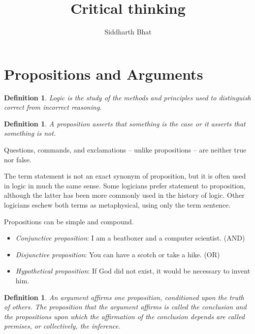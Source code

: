 \documentclass[5pt]{book}
\title{Critical thinking}
\author{Siddharth Bhat}
\date{}
\newtheorem{definition}[theorem]{Definition}
\begin{document}
\maketitle
\tableofcontents

\section{Propositions and Arguments}
\begin{definition}
    Logic is the study of the methods and principles used to distinguish 
    correct from incorrect reasoning.
\end{definition}

\begin{definition}
    A proposition asserts that something is the case or it asserts that 
    something is not.
\end{definition}

Questions, commands, and exclamations -- unlike propositions -- are neither 
true nor false.

The term statement is not an exact synonym of proposition, but it is often used
in logic in much the same sense. Some logicians prefer statement to proposition,
although the latter has been more commonly used in the history of logic. Other
logicians eschew both terms as metaphysical, using only the term sentence.

Propositions can be simple and compound.

\begin{itemize}
    \item \textit{Conjunctive proposition}: I am a beatboxer and a computer 
        scientist. (AND)

    \item \textit{Disjunctive proposition}: You can have a scotch or take a 
        hike. (OR)

    \item \textit{Hypothetical proposition}: If God did not exist, it would be 
        necessary to invent him.
\end{itemize}

\begin{definition}
    An argument affirms one proposition, conditioned upon the truth of others.
    The proposition that the argument affirms is called the conclusion and the
    propositions upon which the affirmation of the conclusion depends are called 
    premises, or collectively, the inference.
\end{definition}
\end{document}
